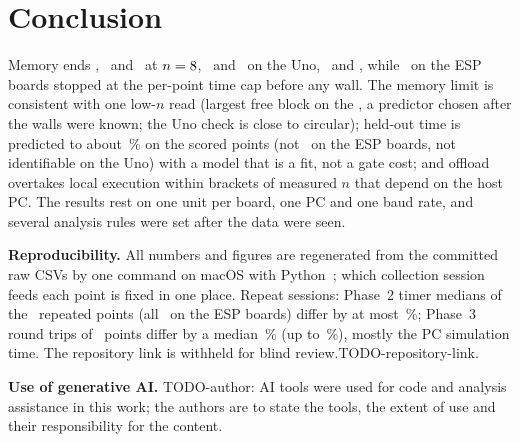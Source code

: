 \section{Conclusion}
Memory ends \hall, \bell\ and \qft\ at $n=8$, \MemWallEspLo\ and \MemWallEspHi\ on the Uno, \espA\ and \espB, while \grover\ on the ESP boards stopped at the per-point time cap before any wall. The memory limit is consistent with one low-$n$ read (largest free block on the \espB, a predictor chosen after the walls were known; the Uno check is close to circular); held-out time is predicted to about \MapeTwoClean\,\% on the scored points (not \grover\ on the ESP boards, not identifiable on the Uno) with a model that is a fit, not a gate cost; and offload overtakes local execution within brackets of measured $n$ that depend on the host PC. The results rest on one unit per board, one PC and one baud rate, and several analysis rules were set after the data were seen.

\textbf{Reproducibility.} All numbers and figures are regenerated from the committed raw CSVs by one command on macOS with Python~\PyVer; which collection session feeds each point is fixed in one place. Repeat sessions: Phase~2 timer medians of the \ReproPtwoN\ repeated points (all \grover\ on the ESP boards) differ by at most \ReproPtwoMaxPct\,\%; Phase~3 round trips of \ReproPthreeN\ points differ by a median \ReproPthreeE\,\% (up to \ReproPthreeEMax\,\%), mostly the PC simulation time. \ifblind The repository link is withheld for blind review.\else TODO-repository-link.\fi

\textbf{Use of generative AI.} %
TODO-author: AI tools were used for code and analysis assistance in this work; the authors are to state the tools, the extent of use and their responsibility for the content.
